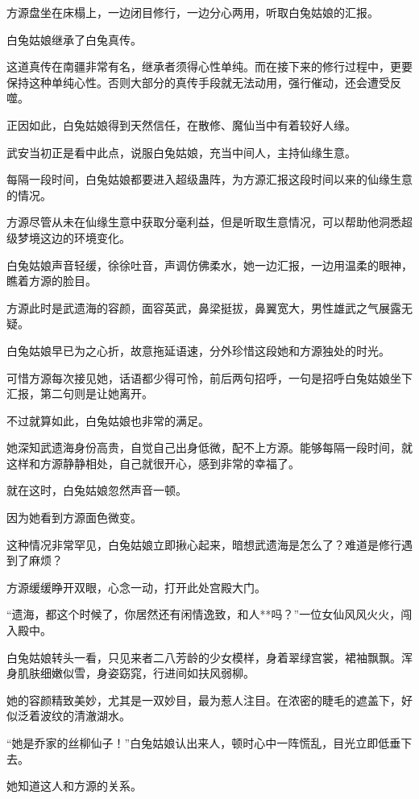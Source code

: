 \begin{this_body}
方源盘坐在床榻上，一边闭目修行，一边分心两用，听取白兔姑娘的汇报。

白兔姑娘继承了白兔真传。

这道真传在南疆非常有名，继承者须得心性单纯。而在接下来的修行过程中，更要保持这种单纯心性。否则大部分的真传手段就无法动用，强行催动，还会遭受反噬。

正因如此，白兔姑娘得到天然信任，在散修、魔仙当中有着较好人缘。

武安当初正是看中此点，说服白兔姑娘，充当中间人，主持仙缘生意。

每隔一段时间，白兔姑娘都要进入超级蛊阵，为方源汇报这段时间以来的仙缘生意的情况。

方源尽管从未在仙缘生意中获取分毫利益，但是听取生意情况，可以帮助他洞悉超级梦境这边的环境变化。

白兔姑娘声音轻缓，徐徐吐音，声调仿佛柔水，她一边汇报，一边用温柔的眼神，瞧着方源的脸目。

方源此时是武遗海的容颜，面容英武，鼻梁挺拔，鼻翼宽大，男性雄武之气展露无疑。

白兔姑娘早已为之心折，故意拖延语速，分外珍惜这段她和方源独处的时光。

可惜方源每次接见她，话语都少得可怜，前后两句招呼，一句是招呼白兔姑娘坐下汇报，第二句则是让她离开。

不过就算如此，白兔姑娘也非常的满足。

她深知武遗海身份高贵，自觉自己出身低微，配不上方源。能够每隔一段时间，就这样和方源静静相处，自己就很开心，感到非常的幸福了。

就在这时，白兔姑娘忽然声音一顿。

因为她看到方源面色微变。

这种情况非常罕见，白兔姑娘立即揪心起来，暗想武遗海是怎么了？难道是修行遇到了麻烦？

方源缓缓睁开双眼，心念一动，打开此处宫殿大门。

“遗海，都这个时候了，你居然还有闲情逸致，和人**吗？”一位女仙风风火火，闯入殿中。

白兔姑娘转头一看，只见来者二八芳龄的少女模样，身着翠绿宫裳，裙袖飘飘。浑身肌肤细嫩似雪，身姿窈窕，行进间如扶风弱柳。

她的容颜精致美妙，尤其是一双妙目，最为惹人注目。在浓密的睫毛的遮盖下，好似泛着波纹的清澈湖水。

“她是乔家的丝柳仙子！”白兔姑娘认出来人，顿时心中一阵慌乱，目光立即低垂下去。

她知道这人和方源的关系。


\end{this_body}
